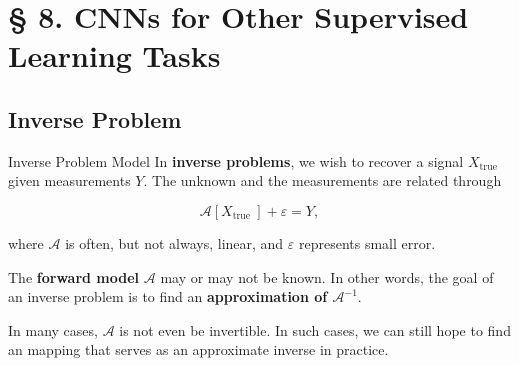 \section{§ 8. CNNs for Other Supervised Learning Tasks}

\subsection{Inverse Problem}

\begin{frame}[allowframebreaks]

\begin{mydefinitionblock}{8.1}{Inverse Problem Model}
    In \textbf{inverse problems}, we wish to recover a signal $X_{\text {true }}$ given measurements $Y$. The unknown and the measurements are related through

    $$
    \mathcal{A}\left[X_{\text {true }}\right]+\varepsilon=Y,
    $$

    where $\mathcal{A}$ is often, but not always, linear, and $\varepsilon$ represents small error.

    The \textbf{forward model} $\mathcal{A}$ may or may not be known. In other words, the goal of an inverse problem is to find an \textbf{approximation of $\mathcal{A}^{-1}$}.

    In many cases, $\mathcal{A}$ is not even be invertible. In such cases, we can still hope to find an mapping that serves as an approximate inverse in practice.
\end{mydefinitionblock}

\end{frame}

